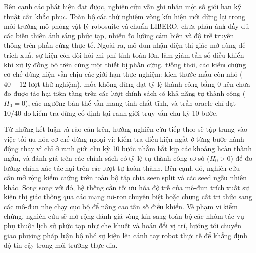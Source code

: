 Bên cạnh các phát hiện đạt được, nghiên cứu vẫn ghi nhận một số giới hạn kỹ thuật cần khắc phục. Toàn bộ các thử nghiệm vòng kín hiện mới dừng lại trong môi trường mô phỏng vật lý robosuite và chuẩn LIBERO, chưa phản ánh đầy đủ các biến thiên ánh sáng phức tạp, nhiễu đo lường cảm biến và độ trễ truyền thông trên phần cứng thực tế. Ngoài ra, mô-đun nhận diện thị giác mở dùng để trích xuất sự kiện còn đòi hỏi chi phí tính toán lớn, làm giảm tần số điều khiển khi xử lý đồng bộ trên cùng một thiết bị phần cứng. Đồng thời, các kiểm chứng cơ chế dừng hiện vẫn chịu các giới hạn thực nghiệm: kích thước mẫu còn nhỏ ($40 + 12$ lượt thử nghiệm), mốc không dừng đạt tỷ lệ thành công bằng 0 nên chưa đo được tác hại tiềm tàng trên các lượt chính sách có khả năng tự thành công ($H_0 = 0$), các ngưỡng bản thể vẫn mang tính chất tĩnh, và trần oracle chỉ đạt $10/40$ do kiểm tra dừng cố định tại ranh giới truy vấn chu kỳ 10 bước.

Từ những kết luận và rào cản trên, hướng nghiên cứu tiếp theo sẽ tập trung vào việc tối ưu hóa cơ chế dừng ngoại vi: kiểm tra điều kiện ngắt ở từng bước hành động thay vì chỉ ở ranh giới chu kỳ 10 bước nhằm bắt kịp các khoảng hoàn thành ngắn, và đánh giá trên các chính sách có tỷ lệ tự thành công cơ sở ($H_0 > 0$) để đo lường chính xác tác hại trên các lượt tự hoàn thành. Bên cạnh đó, nghiên cứu cần mở rộng kiểm chứng trên toàn bộ tập chia seen split và các seed ngẫu nhiên khác. Song song với đó, hệ thống cần tối ưu hóa độ trễ của mô-đun trích xuất sự kiện thị giác thông qua các mạng nơ-ron chuyên biệt hoặc chưng cất tri thức sang các mô-đun nhẹ chạy cục bộ để nâng cao tần số điều khiển. Về phạm vi kiểm chứng, nghiên cứu sẽ mở rộng đánh giá vòng kín sang toàn bộ các nhóm tác vụ phụ thuộc lịch sử phức tạp như che khuất và hoán đổi vị trí, hướng tới chuyển giao phương pháp luận bộ nhớ sự kiện lên cánh tay robot thực tế để khẳng định độ tin cậy trong môi trường thực địa.
